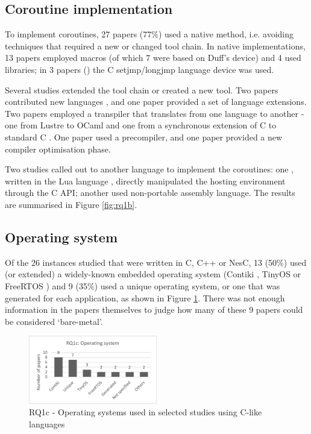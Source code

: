 \documentclass[format=acmsmall, review=false, screen=false]{acmart}
\begin{document}
\subsection{Coroutine implementation}

To implement coroutines, 27 papers (77\%) used a native method, i.e. avoiding techniques that required a new or changed tool chain. In native implementations, 13 papers employed macros (of which 7 were based on Duff’s device) and 4 used libraries; in 3 papers (\cite{Yu2008, Cohen2007b, Kalebe2017}) the C setjmp/longjmp language device was used.

Several studies extended the tool chain or created a new tool. Two papers contributed new languages \cite{Jahier2016, Evers2007}, and one paper \cite{Niebert2014} provided a set of language extensions. Two papers employed a transpiler that translates from one language to another - one from Lustre to OCaml \cite{Jahier2016} and one from a synchronous extension of C to standard C \cite{Karpin2007}. One paper \cite{Fritzsche2010} used a precompiler, and one paper \cite{Jaaskelainen2008} provided a new compiler optimisation phase.

Two studies called out to another language to implement the coroutines: one \cite{Park2015}, written in the Lua language \cite{Moura2004a}, directly manipulated the hosting environment through the C API; another \cite{Khezri2008} used non-portable assembly language. The results are summarised in Figure \ref{fig:rq1b}.

\subsection{Operating system}

Of the 26 instances studied that were written in C, C++ or NesC, 13 (50\%) used (or extended) a widely-known embedded operating system (Contiki \cite{Dunkels2004}, TinyOS \cite{Levis2005} or FreeRTOS \cite{Barry2018}) and 9 (35\%) used a unique operating system, or one that was generated for each application, as shown in Figure \ref{fig:rq1c}. There was not enough information in the papers themselves to judge how many of these 9 papers could be considered ‘bare-metal’.

\begin{figure}[h]
	\includegraphics[width=0.5\textwidth]{RQ1c-Operating-systems-used-in-selected-c-like-studies}
	\caption{RQ1c - Operating systems used in selected studies using C-like languages}
	\label{fig:rq1c}
\end{figure}
\end{document}
